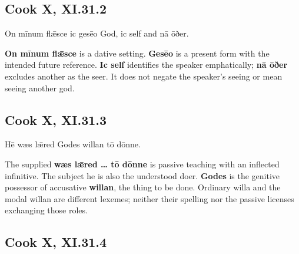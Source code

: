\subsection*{Cook X, XI.31.2}

\par\begin{minipage}{\linewidth}\raggedright
On mīnum flǣsce ic gesēo God, ic self and nā ōðer.

\textbf{On mīnum flǣsce} is a dative setting. \textbf{Gesēo} is a present form with the intended future reference. \textbf{Ic self} identifies the speaker emphatically; \textbf{nā ōðer} excludes another as the seer. It does not negate the speaker’s seeing or mean seeing another god.

\end{minipage}\par\addvspace{4pt}

\subsection*{Cook X, XI.31.3}

\par\begin{minipage}{\linewidth}\raggedright
Hē wæs lǣred Godes willan tō dōnne.

The supplied \textbf{wæs lǣred … tō dōnne} is passive teaching with an inflected infinitive. The subject he is also the understood doer. \textbf{Godes} is the genitive possessor of accusative \textbf{willan}, the thing to be done. Ordinary willa and the modal willan are different lexemes; neither their spelling nor the passive licenses exchanging those roles.

\end{minipage}\par\addvspace{4pt}

\subsection*{Cook X, XI.31.4}

